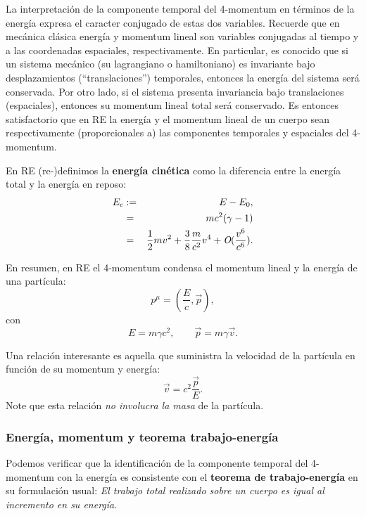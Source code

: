 La interpretación de la componente temporal del 4-momentum en términos de la energía expresa el caracter conjugado de estas dos variables. Recuerde que en mecánica clásica energía y momentum lineal son variables conjugadas al tiempo y a las coordenadas espaciales, respectivamente. En particular, es conocido que si un sistema mecánico (su lagrangiano o hamiltoniano) es invariante bajo desplazamientos (``translaciones'') temporales, entonces la energía del sistema será conservada. Por otro lado, si el sistema presenta invariancia bajo translaciones (espaciales), entonces su momentum lineal total será conservado. Es entonces satisfactorio que en RE la energía y el momentum lineal de un cuerpo sean respectivamente (proporcionales a) las componentes temporales y espaciales del 4-momentum.

En RE (re-)definimos la \textbf{energía cinética} como la diferencia entre la
energía total y la energía en reposo:
\begin{eqnarray}
E_{c}&:=&E-E_0,\\
&=&mc^2(\gamma-1)\\
&=&\frac{1}{2}mv^2+\frac{3}{8}\frac{m}{c^2}v^4+\emph{O}(\frac{v^{6}}{c^{6}}).
\end{eqnarray}

En resumen, en RE el 4-momentum condensa el momentum lineal y la energía de una
partícula:
\begin{equation}
\boxed{p^\mu=(\frac{E}{c},\vec{p}) ,\label{pep}}
\end{equation}
con
\begin{equation}
\boxed{E=m\gamma c^2, \qquad \vec{p}=m\gamma \vec{v}.}
\end{equation}


Una relación interesante es aquella que suministra la velocidad de la
partícula en función de su momentum y energía:
\begin{equation}
\vec{v}=c^2\frac{\vec{p}}{E}. \label{vpe}
\end{equation}
Note que esta relación \textit{no involucra la masa} de la partícula.

\subsubsection{Energía, momentum y teorema trabajo-energía}
Podemos verificar que la identificación de la componente temporal del 4-momentum con la energía es consistente con el \textbf{teorema de trabajo-energía} en su formulación usual: \textit{El trabajo total realizado sobre un cuerpo es igual al incremento en su energía}.

